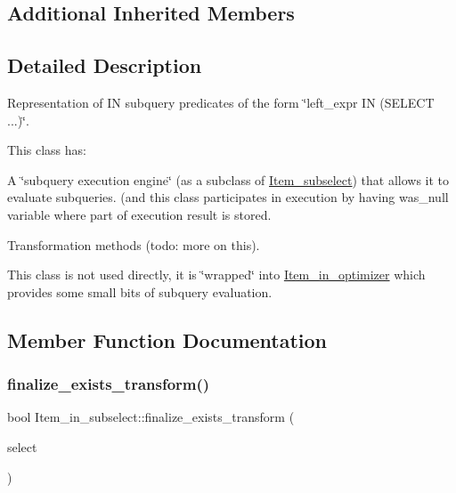 \subsection*{Additional Inherited Members}


\subsection{Detailed Description}
Representation of IN subquery predicates of the form \char`\"{}left\+\_\+expr I\+N (\+S\+E\+L\+E\+C\+T ...)\char`\"{}.

This class has\+:
\begin{DoxyItemize}
\item A \char`\"{}subquery execution engine\char`\"{} (as a subclass of \mbox{\hyperlink{classItem__subselect}{Item\+\_\+subselect}}) that allows it to evaluate subqueries. (and this class participates in execution by having was\+\_\+null variable where part of execution result is stored.
\item Transformation methods (todo\+: more on this).
\end{DoxyItemize}

This class is not used directly, it is \char`\"{}wrapped\char`\"{} into \mbox{\hyperlink{classItem__in__optimizer}{Item\+\_\+in\+\_\+optimizer}} which provides some small bits of subquery evaluation. 

\subsection{Member Function Documentation}
\mbox{\label{classItem__in__subselect_a8ac40ba57762bb8b3060b9ebc2072def}} 
\subsubsection{\texorpdfstring{finalize\+\_\+exists\+\_\+transform()}{finalize\_exists\_transform()}}
{\footnotesize\ttfamily bool Item\+\_\+in\+\_\+subselect\+::finalize\+\_\+exists\+\_\+transform (\begin{DoxyParamCaption}\item[{st\+\_\+select\+\_\+lex $\ast$}]{select }\end{DoxyParamCaption})}

